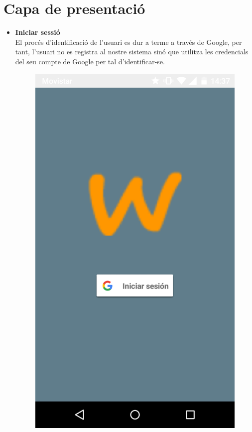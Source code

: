 \section{Capa de presentació}
\begin{itemize}

\item[]{\textbf{Iniciar sessió}}\\
El procés d'identificació de l'usuari es dur a terme a través de Google, per tant, l'usuari no es registra al nostre sistema sinó que utilitza les credencials del seu compte de Google per tal d'identificar-se.


\begin{figure}[!h]
\centering
\includegraphics[scale=0.15]{Figures/initSesion.png}

\end{figure}
\end{itemize}
